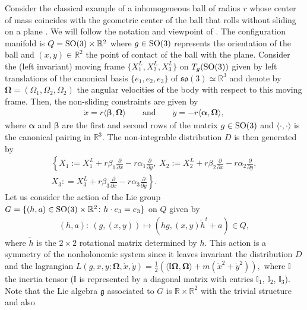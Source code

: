 \documentclass[10pt,a4paper]{amsart}
\numberwithin{equation}{section}
\def\R{\mathbb{R}}
\def\g{\mathfrak{g}}
\def\vecOm{\boldsymbol{\Omega}}
\newcommand{\SO}{{\rm SO}}
\def\so{\mathfrak{so}}
\def\vecalpha{\boldsymbol{\alpha}}
\def\vecbeta{\boldsymbol{\beta}}
\begin{document}
Consider the classical example of a inhomogeneous ball of radius $r$ whose center of mass coincides with the geometric center of the ball that rolls without sliding on a plane \cite{BoMa2001,BoMaKi2002}. We will follow the notation and viewpoint of \cite{Paula, Luis}.  The conf\/iguration manifold is $Q = \SO(3) \times \R^2$ where $g \in \SO(3)$ represents the orientation of the ball and $(x,y)\in \R^2$ the point of contact of the ball with the plane. Consider the (left invariant) moving frame $\{X_1^L, X_2^L, X_3^L \}$ on $T_g(\SO(3))$ given by left translations of the canonical basis $\{e_1, e_2, e_3\}$ of $\so (3) \simeq \R^3$ and denote by $\vecOm = (\Omega_1, \Omega_2, \Omega_2)$ the angular velocities of the body with respect to this moving frame.  Then, the non-sliding constraints are given by
\begin{gather*}
\dot x = r \langle \vecbeta, \vecOm\rangle \qquad \mbox{and} \qquad  \dot y = - r\langle \vecalpha, \vecOm\rangle,
\end{gather*}
where $\vecalpha$ and $\vecbeta$ are the f\/irst and second rows of the matrix $g\in\SO(3)$ and $\langle \cdot, \cdot \rangle$ is the canonical pairing in $\R^3$. The non-integrable distribution $D$ is then generated by
\begin{gather*}
\left\{ X_1 := X_1^L + r\beta_1 \frac{\partial}{\partial x} - r \alpha_1 \frac{\partial}{\partial y} , \; X_2 := X_2^L + r \beta_2 \frac{\partial}{\partial x} - r\alpha_2 \frac{\partial}{\partial y},\right.\\
\left. X_3 : = X_3^L + r \beta_3 \frac{\partial}{\partial x} - r\alpha_3 \frac{\partial}{\partial y} \right\} .
\end{gather*}
Let us consider the action of the Lie group $G=\{ (h,a) \in \SO(3) \times \R^2 \colon h\cdot e_3 = e_3 \}$ on $Q$ given by
\begin{gather*}
(h,a) \colon \ (g, (x,y)) \mapsto (h g, (x,y) \tilde h^t + a) \in Q,
\end{gather*}
where $\tilde h$ is the $2\times 2$ rotational matrix determined by $h$.  This action is a symmetry of the nonholonomic system since it leaves invariant the distribution $D$ and the lagrangian $L (g, x,y; \vecOm, \dot x, \dot y) = \frac{1}{2}\left( \langle \mathbb{I} \vecOm, \vecOm \rangle + m( \dot x^2 + \dot y^2) \right),
$ where $\mathbb{I}$ the inertia tensor ($\mathbb{I}$ is represented by a diagonal matrix with entries $\mathbb{I}_1$, $\mathbb{I}_2$, $\mathbb{I}_3$). Note that the Lie algebra $\g$ associated to $G$ is $\R\times \R^2$ with the trivial structure and also
\end{document}

